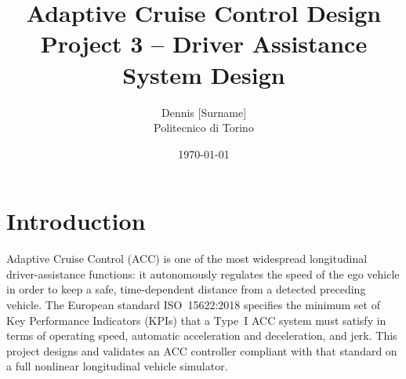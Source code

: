 %
%

\title{Adaptive Cruise Control Design \\ \large Project 3 -- Driver Assistance System Design}
\author{Dennis [Surname] \\ Politecnico di Torino}
\date{\today}
\maketitle

\section{Introduction}
Adaptive Cruise Control (ACC) is one of the most widespread longitudinal
driver-assistance functions: it autonomously regulates the speed of the
ego vehicle in order to keep a safe, time-dependent distance from a
detected preceding vehicle. The European standard
ISO~15622:2018 specifies the minimum set of Key Performance Indicators
(KPIs) that a Type~I ACC system must satisfy in terms of operating
speed, automatic acceleration and deceleration, and jerk. This project
designs and validates an ACC controller compliant with that standard
on a full nonlinear longitudinal vehicle simulator.

